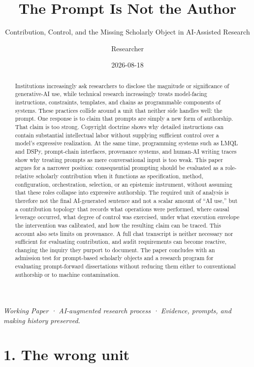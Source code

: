 \documentclass[
]{article}
\title{The Prompt Is Not the Author}
\subtitle{Contribution, Control, and the Missing Scholarly Object in
AI-Assisted Research}
\author{Researcher}
\date{2026-08-18}
\begin{document}
\maketitle
\begin{abstract}
Institutions increasingly ask researchers to disclose the magnitude or
significance of generative-AI use, while technical research increasingly
treats model-facing instructions, constraints, templates, and chains as
programmable components of systems. These practices collide around a
unit that neither side handles well: the prompt. One response is to
claim that prompts are simply a new form of authorship. That claim is
too strong. Copyright doctrine shows why detailed instructions can
contain substantial intellectual labor without supplying sufficient
control over a model's expressive realization. At the same time,
programming systems such as LMQL and DSPy, prompt-chain interfaces,
provenance systems, and human-AI writing traces show why treating
prompts as mere conversational input is too weak. This paper argues for
a narrower position: consequential prompting should be evaluated as a
role-relative scholarly contribution when it functions as specification,
method, configuration, orchestration, selection, or an epistemic
instrument, without assuming that these roles collapse into expressive
authorship. The required unit of analysis is therefore not the final
AI-generated sentence and not a scalar amount of ``AI use,'' but a
contribution topology that records what operations were performed, where
causal leverage occurred, what degree of control was exercised, under
what execution envelope the intervention was calibrated, and how the
resulting claim can be traced. This account also sets limits on
provenance. A full chat transcript is neither necessary nor sufficient
for evaluating contribution, and audit requirements can become reactive,
changing the inquiry they purport to document. The paper concludes with
an admission test for prompt-based scholarly objects and a research
program for evaluating prompt-forward dissertations without reducing
them either to conventional authorship or to machine contamination.
\end{abstract}

\emph{Working Paper · AI-augmented research process · Evidence, prompts,
and making history preserved.}

\section{1. The wrong unit}\label{the-wrong-unit}
\end{document}
